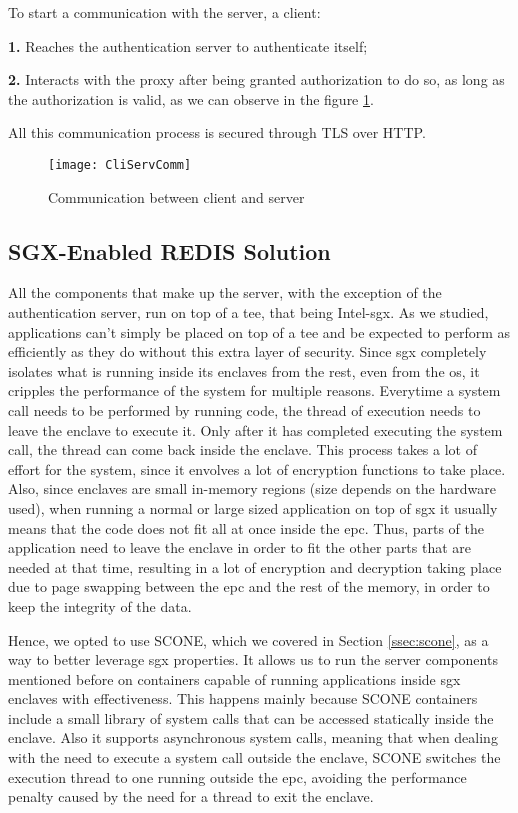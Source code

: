 To start a communication with the server, a client: 

\textbf{1.} Reaches the authentication server to authenticate itself;

\textbf{2.} Interacts with the proxy after being granted authorization to do so, as long as the authorization is valid, as we can observe in the figure \ref{fig:client_serverModel}. 

All this communication process is secured through TLS over HTTP.

\begin{figure}[htbp]
	\centering
	{\texttt{[image: CliServComm]}}
	\caption{Communication between client and server}
	\label{fig:client_serverModel}
\end{figure}



\subsection{SGX-Enabled REDIS Solution} %
\label{ssec:sgx_redisSolution}

All the components that make up the server, with the exception of the authentication server, run on top of a \gls{tee}, that being Intel-\gls{sgx}. As we studied, applications can't simply be placed on top of a \gls{tee} and be expected to perform as efficiently as they do without this extra layer of security. 
Since \gls{sgx} completely isolates what is running inside its enclaves from the rest, even from the \gls{os}, it cripples the performance of the system for multiple reasons. Everytime a system call needs to be performed by running code, the thread of execution needs to leave the enclave to execute it. Only after it has completed executing the system call, the thread can come back inside the enclave. This process takes a lot of effort for the system, since it envolves a lot of encryption functions to take place. 
Also, since enclaves are small in-memory regions (size depends on the hardware used), when running a normal or large sized application on top of \gls{sgx} it usually means that the code does not fit all at once inside the \gls{epc}. 
Thus, parts of the application need to leave the enclave in order to fit the other parts that are needed at that time, resulting in a lot of encryption and decryption taking place due to page swapping between the \gls{epc} and the rest of the memory, in order to keep the integrity of the data.  

Hence, we opted to use SCONE, which we covered in Section  \ref{ssec:scone}, as a way to better leverage \gls{sgx} properties. It allows us to run the server components mentioned before on containers capable of running applications inside \gls{sgx} enclaves with effectiveness. This happens mainly because SCONE containers include a small library of system calls that can be accessed statically inside the enclave. Also it supports asynchronous system calls, meaning that when dealing with the need to execute a system call outside the enclave, SCONE switches the execution thread to one running outside the \gls{epc}, avoiding the performance penalty caused by the need for a thread to exit the enclave. 

